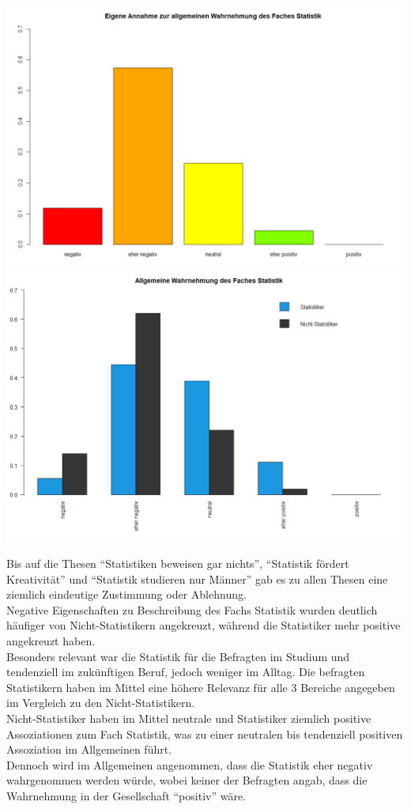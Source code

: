 \documentclass[12pt,a4paper,titlepage=true,parskip,ngerman]{scrartcl}
\begin{document}
\hspace{-2cm}
\includegraphics[scale=0.3]{barplot_Wahrnehmung}
\includegraphics[scale=0.3]{(nicht)-statis_barplot_Wahrnehmung}\\

\vspace{-0.4cm}

{\small Bis auf die Thesen \enquote{Statistiken beweisen gar nichts}, \enquote{Statistik fördert Kreativität} und \enquote{Statistik studieren nur Männer} gab es zu allen Thesen eine ziemlich eindeutige Zustimmung oder Ablehnung.\\
Negative Eigenschaften zu Beschreibung des Fachs Statistik wurden deutlich häufiger von Nicht-Statistikern angekreuzt, während die Statistiker mehr positive angekreuzt haben.\\
Besonders relevant war die Statistik für die Befragten im Studium und tendenziell im zukünftigen Beruf, jedoch weniger im Alltag. Die befragten Statistikern haben im Mittel eine höhere Relevanz für alle 3 Bereiche angegeben im Vergleich zu den Nicht-Statistikern.\\
Nicht-Statistiker haben im Mittel neutrale und Statistiker ziemlich positive Assoziationen zum Fach Statistik, was zu einer neutralen bis tendenziell positiven Assoziation im Allgemeinen führt.\\
Dennoch wird im Allgemeinen angenommen, dass die Statistik eher negativ wahrgenommen werden würde, wobei keiner der Befragten angab, dass die Wahrnehmung in der Gesellschaft \enquote{positiv} wäre.}
\end{document}
